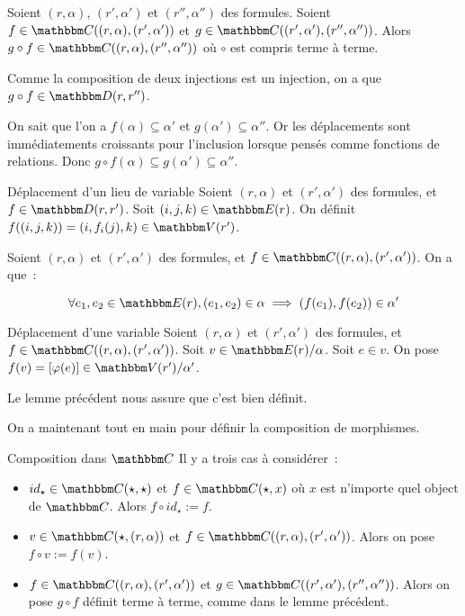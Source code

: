 \begin{lem}
    Soient $(r,\alpha)$, $(r',\alpha')$ et $(r'',\alpha'')$ des formules.
    Soient $f\in\C((r,\alpha),(r',\alpha'))$
        et $g\in\C((r',\alpha'),(r'',\alpha''))$.
    Alors $g\circ f\in\C((r,\alpha),(r'',\alpha''))$ où $\circ$ est compris
    terme à terme.
\end{lem}

\begin{pv}
    Comme la composition de deux injections est un injection, on a que
    $g\circ f\in\D(r,r'')$.

    On sait que l'on a $f(\alpha)\subseteq \alpha'$ et $g(\alpha')\subseteq \alpha''$. Or
    les déplacements sont immédiatements croissants pour l'inclusion lorsque pensés
    comme fonctions de relations.
    Donc $g\circ f(\alpha)\subseteq g(\alpha')\subseteq \alpha''$.
\end{pv}

\begin{defi}{Déplacement d'un lieu de variable}
    Soient $(r,\alpha)$ et $(r',\alpha')$ des formules, et $f\in\D(r,r')$.
    Soit $(i,j,k)\in\E(r)$. On définit $f((i,j,k)) = (i, f_i(j), k)\in\V(r')$.
\end{defi}

\begin{lem}
    Soient $(r,\alpha)$ et $(r',\alpha')$ des formules, et
    $f\in\C((r,\alpha),(r',\alpha'))$.
    On a que~:
    
    \[\forall e_1,e_2\in\E(r), (e_1,e_2)\in\alpha\implies (f(e_1),f(e_2))\in \alpha'\]
\end{lem}

\begin{defi}{Déplacement d'une variable}
    Soient $(r,\alpha)$ et $(r',\alpha')$ des formules, et
    $f\in\C((r,\alpha),(r',\alpha'))$.
    Soit $v\in\E(r)/\alpha$. Soit $e\in v$. On pose $f(v) = [\phi(e)]\in\V(r')/\alpha'$.

    Le lemme précédent nous assure que c'est bien définit.
\end{defi}

On a maintenant tout en main pour définir la composition de morphismes.

\begin{defi}{Composition dans $\C$}
    Il y a trois cas à considérer~:\begin{itemize}
        \item $id_\star\in\C(\star,\star)$ et $f\in\C(\star, x)$ où $x$ est n'importe
            quel object de $\C$. Alors $f\circ id_\star := f$.
        \item $v\in\C(\star, (r,\alpha))$ et $f\in\C((r,\alpha), (r',\alpha'))$. Alors
            on pose $f\circ v := f(v)$.
        \item $f\in\C((r,\alpha),(r',\alpha'))$ et $g\in\C((r',\alpha'),(r'',\alpha''))$.
            Alors on pose $g\circ f$ définit terme à terme, comme dans le lemme
            précédent.
    \end{itemize}
\end{defi}

